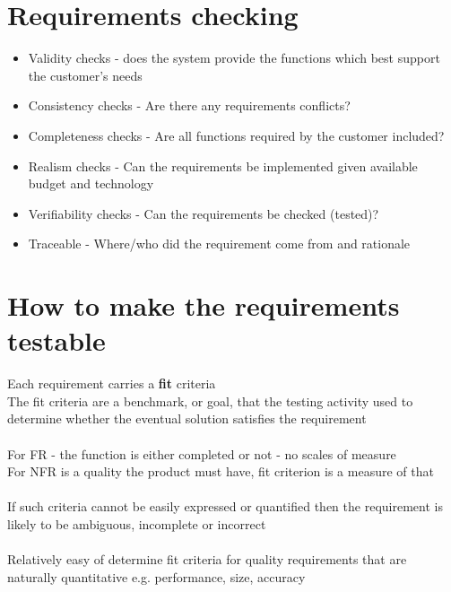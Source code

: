 \documentclass{article}[18pt]
\begin{document}
\section{Requirements checking}
\begin{itemize}
	\item Validity checks - does the system provide the functions which best support the customer's needs
	\item Consistency checks - Are there any requirements conflicts?
	\item Completeness checks - Are all functions required by the customer included?
	\item Realism checks - Can the requirements be implemented given available budget and technology
	\item Verifiability checks - Can the requirements be checked (tested)?
	\item Traceable - Where/who did the requirement come from and rationale
\end{itemize}
\section{How to make the requirements testable}
Each requirement carries a \textbf{fit} criteria\\
The fit criteria are a benchmark, or goal, that the testing activity used to determine whether the eventual solution satisfies the requirement\\
\\
For FR - the function is either completed or not - no scales of measure\\
For NFR is a quality the product must have, fit criterion is a measure of that\\
\\
If such criteria cannot be easily expressed or quantified then the requirement is likely to be ambiguous, incomplete or incorrect\\
\\
Relatively easy of determine fit criteria for quality requirements that are naturally quantitative e.g. performance, size, accuracy 
\end{document}
